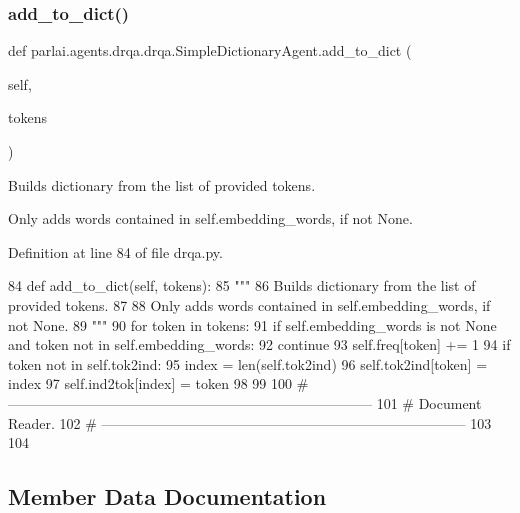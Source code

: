 \subsubsection{\texorpdfstring{add\+\_\+to\+\_\+dict()}{add\_to\_dict()}}
{\footnotesize\ttfamily def parlai.\+agents.\+drqa.\+drqa.\+Simple\+Dictionary\+Agent.\+add\+\_\+to\+\_\+dict (\begin{DoxyParamCaption}\item[{}]{self,  }\item[{}]{tokens }\end{DoxyParamCaption})}

\begin{DoxyVerb}Builds dictionary from the list of provided tokens.

Only adds words contained in self.embedding_words, if not None.
\end{DoxyVerb}
 

Definition at line 84 of file drqa.\+py.


\begin{DoxyCode}
84     \textcolor{keyword}{def }add\_to\_dict(self, tokens):
85         \textcolor{stringliteral}{"""}
86 \textcolor{stringliteral}{        Builds dictionary from the list of provided tokens.}
87 \textcolor{stringliteral}{}
88 \textcolor{stringliteral}{        Only adds words contained in self.embedding\_words, if not None.}
89 \textcolor{stringliteral}{        """}
90         \textcolor{keywordflow}{for} token \textcolor{keywordflow}{in} tokens:
91             \textcolor{keywordflow}{if} self.embedding\_words \textcolor{keywordflow}{is} \textcolor{keywordflow}{not} \textcolor{keywordtype}{None} \textcolor{keywordflow}{and} token \textcolor{keywordflow}{not} \textcolor{keywordflow}{in} self.embedding\_words:
92                 \textcolor{keywordflow}{continue}
93             self.freq[token] += 1
94             \textcolor{keywordflow}{if} token \textcolor{keywordflow}{not} \textcolor{keywordflow}{in} self.tok2ind:
95                 index = len(self.tok2ind)
96                 self.tok2ind[token] = index
97                 self.ind2tok[index] = token
98 
99 
100 \textcolor{comment}{# ------------------------------------------------------------------------------}
101 \textcolor{comment}{# Document Reader.}
102 \textcolor{comment}{# ------------------------------------------------------------------------------}
103 
104 
\end{DoxyCode}


\subsection{Member Data Documentation}
\mbox{\label{classparlai_1_1agents_1_1drqa_1_1drqa_1_1SimpleDictionaryAgent_a26ce0c0cc3362b43219d488826c3550a}} 
